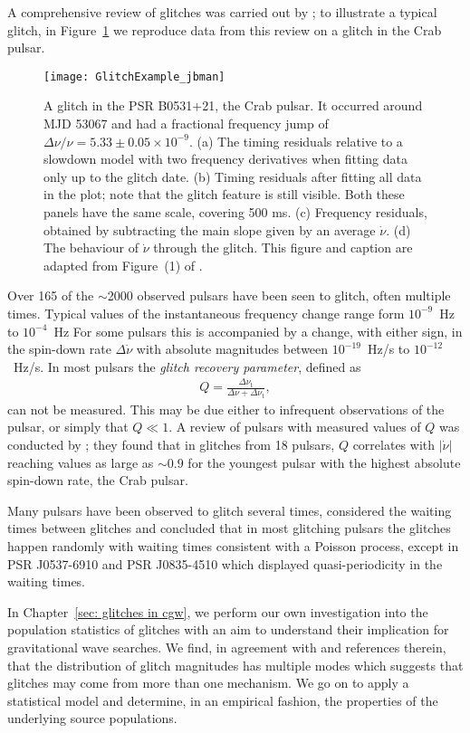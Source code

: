 A comprehensive review of glitches was carried out by
\citet{Espinoza2011}; to illustrate a typical glitch, in Figure~\ref{fig: glitch}
we reproduce data from this review on a glitch in the Crab pulsar.
\begin{figure}[htb]
    \centering
    \texttt{[image: GlitchExample\_jbman]}
    \caption{
A glitch in the PSR B0531+21, the Crab pulsar. It occurred around MJD
53067 and had a fractional frequency jump of $\Delta\nu/\nu = 5.33 \pm 0.05
{\times}10^{−9}$. (a) The timing residuals relative to a
slowdown model with two frequency derivatives when fitting data only up to the
glitch date. (b) Timing residuals after fitting all data in the plot; note
that the glitch feature is still visible. Both these panels have the same
scale, covering 500 ms. (c) Frequency residuals, obtained by subtracting the
main slope given by an average $\dot\nu$. (d) The behaviour of $\dot\nu$
through the glitch. This figure and caption are adapted from Figure~(1) of
\citet{Espinoza2011}.}
    \label{fig: glitch}
\end{figure}

Over 165 of the $\sim$2000 observed pulsars have been seen to glitch, often multiple
times. Typical values of the instantaneous frequency change range form
$10^{-9}$~Hz to $10^{-4}$~Hz For some pulsars this is accompanied by a change,
with either sign, in the spin-down rate $\Delta\dot{\nu}$ with absolute
magnitudes between $10^{-19}$~Hz/s to $10^{-12}$~Hz/s.
In most pulsars the \emph{glitch recovery parameter}, defined as
\begin{align}
Q = \frac{\Delta\nu_\textrm{t}}{\Delta\nu + \Delta\nu_\textrm{t}},
\end{align}
can not be measured. This may be due either to infrequent observations of the
pulsar, or simply that $Q\ll1$.  A review of pulsars with measured values of
$Q$ was conducted by \citet{Lyne2000}; they found that in glitches from 18
pulsars, $Q$ correlates with $|\dot{\nu}|$ reaching values as large as
$\sim0.9$ for the youngest pulsar with the highest absolute spin-down rate,
the Crab pulsar.

Many pulsars have been observed to glitch several times, \citet{Melatos2008}
considered the waiting times between glitches and concluded that in most
glitching pulsars the glitches happen randomly with waiting times consistent
with a Poisson process, except in PSR J0537-6910 and PSR J0835-4510 which
displayed quasi-periodicity in the waiting times.

In Chapter~\ref{sec: glitches in cgw}, we perform our own investigation into the
population statistics of glitches with an aim to understand their implication
for gravitational wave searches. We find, in agreement with
\citet{Espinoza2011} and references therein, that the distribution of glitch
magnitudes has multiple modes which suggests that glitches may come from more
than one mechanism. We go on to apply a statistical model and determine, in an
empirical fashion, the properties of the underlying source populations.

